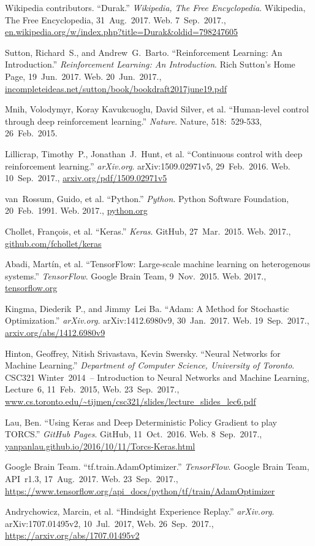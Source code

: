 \documentclass[a4paper,titlepage]{article}
\begin{document}
\begin{thebibliography}{99}

  Wikipedia contributors. ``Durak.'' \emph{Wikipedia, The Free Encyclopedia}. Wikipedia, The Free Encyclopedia, 31~Aug.~2017. Web.
  7~Sep.~2017.,
  \url{en.wikipedia.org/w/index.php?title=Durak&oldid=798247605}

  Sutton, Richard~S., and Andrew~G.\ Barto. ``Reinforcement Learning: An Introduction.'' \emph{Reinforcement Learning: An Introduction}. Rich Sutton's Home Page, 19~Jun.~2017. Web.
  20~Jun.~2017.,
  \url{incompleteideas.net/sutton/book/bookdraft2017june19.pdf}

  Mnih, Volodymyr, Koray Kavukcuoglu, David Silver, et al. ``Human-level control through deep reinforcement learning.'' \emph{Nature}. Nature, 518:~529-533, 26~Feb.~2015.

  Lillicrap, Timothy~P., Jonathan~J.\ Hunt, et al. ``Continuous control with deep reinforcement learning.'' \emph{arXiv.org}. arXiv:1509.02971v5, 29~Feb.~2016. Web.
  10~Sep.~2017.,
  \url{arxiv.org/pdf/1509.02971v5}

  van~Rossum, Guido, et al. ``Python.'' \emph{Python}. Python Software Foundation, 20~Feb.~1991. Web.
  2017.,
  \url{python.org}

  Chollet, Fran\c{c}ois, et al. ``Keras.'' \emph{Keras}. GitHub, 27~Mar.~2015. Web.
  2017.,
  \url{github.com/fchollet/keras}

  Abadi, Martín, et al. ``TensorFlow: Large-scale machine learning on heterogenous systems.'' \emph{TensorFlow}. Google Brain Team, 9~Nov.~2015. Web.
  2017.,
  \url{tensorflow.org}

  Kingma, Diederik~P., and Jimmy~Lei Ba. ``Adam: A Method for Stochastic Optimization.'' \emph{arXiv.org}. arXiv:1412.6980v9, 30~Jan.~2017. Web.
  19~Sep.~2017.,
  \url{arxiv.org/abs/1412.6980v9}

  Hinton, Geoffrey, Nitish Srivastava, Kevin Swersky. ``Neural Networks for Machine Learning.'' \emph{Department of Computer Science, University of Toronto}. CSC321 Winter~2014~-- Introduction to Neural Networks and Machine Learning, Lecture~6, 11~Feb.~2015, Web. 23~Sep.~2017.,
  \url{www.cs.toronto.edu/~tijmen/csc321/slides/lecture_slides_lec6.pdf}

  Lau, Ben. ``Using Keras and Deep Deterministic Policy Gradient to play TORCS.'' \emph{GitHub Pages}. GitHub, 11~Oct.~2016. Web.
  8~Sep.~2017.,
  \url{yanpanlau.github.io/2016/10/11/Torcs-Keras.html}

  Google Brain Team. ``tf.train.AdamOptimizer.'' \emph{TensorFlow}. Google Brain Team, API~r1.3, 17~Aug.~2017. Web.
  23~Sep.~2017.,
  \url{https://www.tensorflow.org/api_docs/python/tf/train/AdamOptimizer}

  Andrychowicz, Marcin, et al. ``Hindsight Experience Replay.'' \emph{arXiv.org}. arXiv:1707.01495v2, 10~Jul.~2017, Web.
  26~Sep.~2017.,
  \url{https://arxiv.org/abs/1707.01495v2}

\end{thebibliography}
\end{document}
